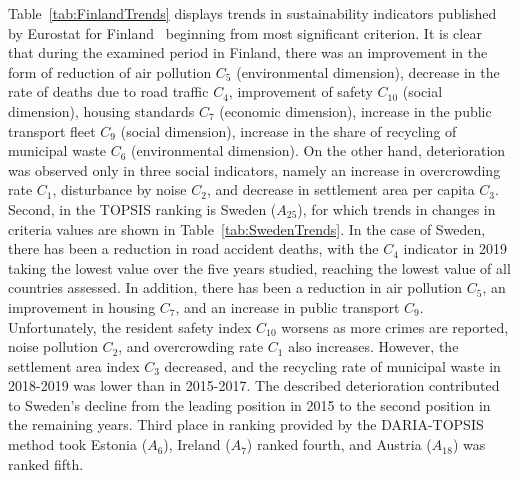 \documentclass[final,5p,times,twocolumn,authoryear]{elsarticle}
\begin{document}
Table~\ref{tab:FinlandTrends} displays trends in sustainability indicators published by Eurostat for Finland~\citep{eurostat2021, brochureEurostat2021, SDGandME2021} beginning from most significant criterion. It is clear that during the examined period in Finland, there was an improvement in the form of reduction of air pollution $C_{5}$ (environmental dimension), decrease in the rate of deaths due to road traffic $C_{4}$, improvement of safety $C_{10}$ (social dimension), housing standards $C_{7}$ (economic dimension), increase in the public transport fleet $C_{9}$ (social dimension), increase in the share of recycling of municipal waste $C_{6}$ (environmental dimension). On the other hand, deterioration was observed only in three social indicators, namely an increase in overcrowding rate $C_{1}$, disturbance by noise $C_{2}$, and decrease in settlement area per capita $C_{3}$. Second, in the TOPSIS ranking is Sweden ($A_{25}$), for which trends in changes in criteria values are shown in Table~\ref{tab:SwedenTrends}. In the case of Sweden, there has been a reduction in road accident deaths, with the $C_{4}$ indicator in 2019 taking the lowest value over the five years studied, reaching the lowest value of all countries assessed. In addition, there has been a reduction in air pollution $C_{5}$, an improvement in housing $C_{7}$, and an increase in public transport $C_{9}$. Unfortunately, the resident safety index $C_{10}$ worsens as more crimes are reported, noise pollution $C_{2}$, and overcrowding rate $C_{1}$ also increases. However, the settlement area index $C_{3}$ decreased, and the recycling rate of municipal waste in 2018-2019 was lower than in 2015-2017. The described deterioration contributed to Sweden's decline from the leading position in 2015 to the second position in the remaining years.
Third place in ranking provided by the DARIA-TOPSIS method took Estonia ($A_{6}$), Ireland ($A_{7}$) ranked fourth, and Austria ($A_{18}$) was ranked fifth. 
\end{document}
